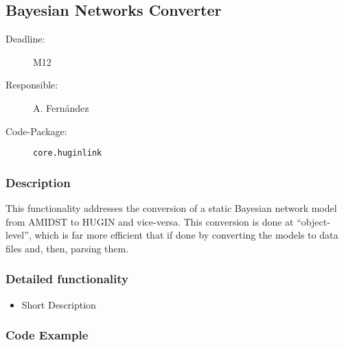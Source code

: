 \newpage
\subsection{Bayesian Networks Converter}
\label{ConverterToAMIDST}

\begin{description}
\item[Deadline:] M12
\item[Responsible:] A. Fern\'andez
\item[Code-Package:] \texttt{core.huginlink}
\end{description}

\subsubsection*{Description}

This functionality addresses the conversion of a static Bayesian network model from AMIDST to HUGIN and vice-versa. This conversion is done at ``object-level'', which is far more efficient that if done by converting the models to data files and, then, parsing them. 

\subsubsection*{Detailed functionality}

\begin{itemize}
\item Short Description
\end{itemize}


\subsubsection*{Code Example}
